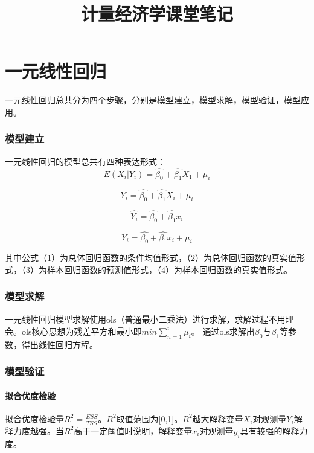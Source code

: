 \documentclass[a4paper，UTF8]{article}
\title{计量经济学课堂笔记}
\begin{document}
\maketitle
\newpage
\tableofcontents
\newpage

\part{一元线性回归}
一元线性回归总共分为四个步骤，分别是模型建立，模型求解，模型验证，模型应用。
\section{模型建立}
一元线性回归的模型总共有四种表达形式：
\begin{equation}
E(X_i|Y_i) = \hat{\beta_0} + \hat{\beta_1}X_1 + \mu_i
\end{equation}

\begin{equation}
Y_i = \hat{\beta_0} + \hat{\beta_1}X_i+\mu_i
\end{equation}

\begin{equation}
\hat{Y_i} = \hat{\beta_0} + \hat{\beta_1}x_i
\end{equation}

\begin{equation}
{Y_i} = \hat{\beta_0} + \hat{\beta_1}x_i + \mu_i
\end{equation}


其中公式（1）为总体回归函数的条件均值形式，（2）为总体回归函数的真实值形式，（3）为样本回归函数的预测值形式，（4）为样本回归函数的真实值形式。


\section{模型求解}
  一元线性回归模型求解使用ols（普通最小二乘法）进行求解，求解过程不用理会。ols核心思想为残差平方和最小即$min\sum_{n=1}^{i}\mu_i $。
  通过ols求解出$\beta_0$与$\beta_1$等参数，得出线性回归方程。
\section{模型验证}
\subsection{拟合优度检验}
拟合优度检验量$R^2 = \frac{ESS}{TSS}$。$R^2$取值范围为[0,1]。$R^2$越大解释变量$X_i$对观测量$Y_i$解释力度越强。当$R^2$高于一定阈值时说明，解释变量$x_i$对观测量$y_i$具有较强的解释力度。 
\end{document}
